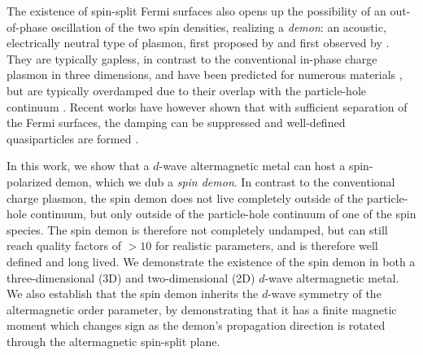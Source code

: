 \documentclass[aps,prl,reprint,twocolumns,superscriptaddress]{revtex4-2}
\begin{document}
	The existence of spin-split Fermi surfaces also opens up the possibility of an out-of-phase oscillation of the two spin densities, realizing a \emph{demon}: an acoustic, electrically neutral type of plasmon, first proposed by \textcite{pinesElectronInteractionSolids1956} and first observed by \textcite{husainPinesDemonObserved2023}. They are typically gapless, in contrast to the conventional in-phase charge plasmon in three dimensions, and have  been predicted for numerous materials \cite{pinesElectronInteractionSolids1956,ruvaldsAreThereAcoustic1981}, but are typically overdamped due to their overlap with the particle-hole continuum \cite{dassarmaCollectiveModesSpatially1981, sensarmaDynamicScreeningLowenergy2010,agarwalLonglivedSpinPlasmons2014,sadhukhanNovelUndampedGapless2020}. Recent works have however shown that with sufficient separation of the Fermi surfaces, the damping can be suppressed and well-defined quasiparticles are formed \cite{agarwalLonglivedSpinPlasmons2014,husainPinesDemonObserved2023}.
	
	

	
	
	
		In this work, we show that a $d$-wave altermagnetic metal can host a spin-polarized demon, which we dub a \emph{spin demon}. In contrast to the conventional charge plasmon, the spin demon does not live completely outside of the particle-hole continuum, but only outside of the particle-hole continuum of one of the spin species. The spin demon is therefore not completely undamped, but can still reach quality factors of $>10$ for realistic parameters, and is therefore well defined and long lived. We demonstrate the existence of the spin demon in both a three-dimensional (3D) and two-dimensional (2D) $d$-wave altermagnetic metal. We also establish that the spin demon inherits the $d$-wave symmetry of the altermagnetic order parameter, by demonstrating that it has a finite magnetic moment which changes sign as the demon's propagation  direction is rotated through the altermagnetic spin-split plane.
		
\end{document}
